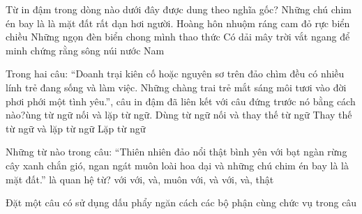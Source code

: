 \begin{ex}
	Từ in đậm trong dòng nào dưới đây được dung theo nghĩa gốc?
	\choice
	{Những chú chim én bay là là mặt đất rất dạn hơi người.}
	{Hoàng hôn nhuộm ráng cam đỏ rực biển chiều}
	{Những ngọn đèn biển chong mình thao thức}
	{Có dải mây trời vắt ngang để minh chứng rằng sông núi nước Nam}
	\loigiai{}
\end{ex}
\begin{ex}
	Trong hai câu: “Doanh trại kiên cố hoặc nguyên sơ trên đảo chìm đều có nhiều lính trẻ đang sống và làm việc. Những chàng trai trẻ mắt sáng môi tươi vào đời phơi phới một tình yêu.”, câu in đậm đã liên kết với câu đứng trước nó bằng cách nào?ùng từ ngữ nối và lặp từ ngữ.
	\choice
	{Dùng từ ngữ nối và thay thế từ ngữ}
	{Thay thế từ ngữ và lặp từ ngữ}
	{Lặp từ ngữ}
	{}
	\loigiai{}
\end{ex}
\begin{ex}
	Những từ nào trong câu: “Thiên nhiên đảo nổi thật bình yên với bạt ngàn rừng cây xanh chắn gió, ngan ngát muôn loài hoa dại và những chú chim én bay là là mặt đất.” là quan hệ từ?
	\choice
	{với}
	{với, và, muôn}
	{với, và}
	{với, và, thật}
	\loigiai{}
\end{ex}

\begin{ex}
	Đặt một câu có sử dụng dấu phẩy ngăn cách các bộ phận cùng chức vụ trong câu 
	\loigiai{}
\end{ex}